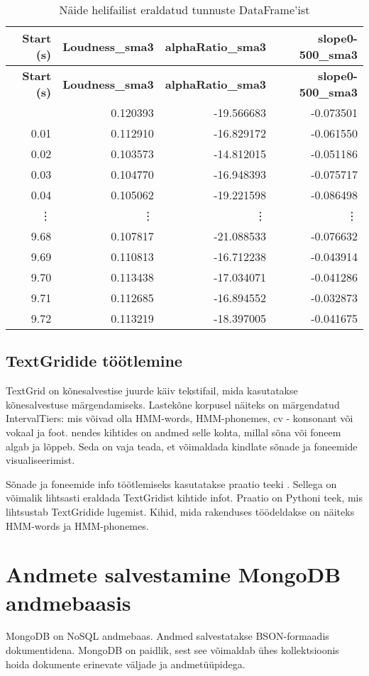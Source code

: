\begin{longtable}{|r|r|r|r|}
    \caption{Näide helifailist eraldatud tunnuste DataFrame'ist}
    \hline
    \textbf{Start (s)} & \textbf{Loudness\_sma3} & \textbf{alphaRatio\_sma3} & \textbf{slope0-500\_sma3} \\
    \hline
    \endfirsthead
    \hline
    \textbf{Start (s)} & \textbf{Loudness\_sma3} & \textbf{alphaRatio\_sma3} &  \textbf{slope0-500\_sma3} \\
    \hline
    \endhead
    \hline
    \endfoot
    \hline
    \endlastfoot
    0.00 & 0.120393 & -19.566683 & -0.073501 \\
    0.01 & 0.112910 & -16.829172 & -0.061550 \\
    0.02 & 0.103573 & -14.812015 & -0.051186 \\
    0.03 & 0.104770 & -16.948393 & -0.075717 \\
    0.04 & 0.105062 & -19.221598 & -0.086498 \\
    \vdots & \vdots & \vdots & \vdots \\
    9.68 & 0.107817 & -21.088533& -0.076632 \\
    9.69 & 0.110813 & -16.712238 & -0.043914 \\
    9.70 & 0.113438 & -17.034071 & -0.041286 \\
    9.71 & 0.112685 & -16.894552 & -0.032873 \\
    9.72 & 0.113219 & -18.397005 & -0.041675 \\
\end{longtable}

\subsection{TextGridide töötlemine}
TextGrid on kõnesalvestise juurde käiv tekstifail, mida kasutatakse kõnesalvestuse märgendamiseks. Lastekõne korpusel näiteks on  märgendatud IntervalTiers: mis võivad olla HMM-words, HMM-phonemes, cv - konsonant või vokaal ja foot. nendes kihtides on andmed selle kohta, millal sõna või foneem algab ja lõppeb. Seda on vaja teada, et võimaldada kindlate sõnade ja foneemide visualiseerimist.

Sõnade ja foneemide info töötlemiseks kasutatakse praatio teeki \cite{praatio}. Sellega on võimalik lihtsasti eraldada TextGridist kihtide infot. Praatio on Pythoni teek, mis lihtsustab TextGridide lugemist. Kihid, mida rakenduses töödeldakse on näiteks HMM-words ja HMM-phonemes. 

\section{Andmete salvestamine MongoDB andmebaasis}
MongoDB on NoSQL andmebaas. Andmed salvestatakse BSON-formaadis dokumentidena. MongoDB on paidlik, sest see võimaldab ühes kollektsioonis hoida dokumente erinevate väljade ja andmetüüpidega. \cite{mongodb}

